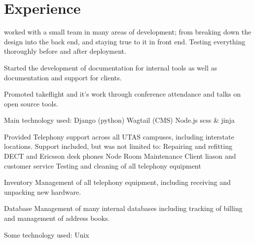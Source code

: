 \documentclass[a4paper]{deedy-resume} %
\begin{document}
\begin{minipage}[t]{0.66\textwidth} %


\section{Experience}


\vspace{\topsep} %
\begin{tightitemize}
\item worked with a small team in many areas of development; from breaking down the design into the back end, and staying true to it in front end. Testing everything thoroughly before and after deployment. \\
\item Started the development of documentation for internal tools as well as documentation and support for clients. \\
\item Promoted takeflight and it's work through conference attendance and talks on open source tools. \\
\item Main technology used: Django (python) \textbullet{} Wagtail (CMS) \textbullet{} Node.js \textbullet{} scss & jinja \\
\end{tightitemize}

\sectionspace %



\begin{tightitemize}
\item Provided Telephony support across all UTAS campuses, including interstate locations. Support included, but was not limited to: Repairing and refitting DECT and Ericsson desk phones \textbullet{} Node Room Maintenance \textbullet{} Client liason and customer service \textbullet{} Testing and cleaning of all telephony equipment \\
\item Inventory Management of all telephony equipment, including receiving and unpacking new hardware. \\
\item Database Management of many internal databases including tracking of billing and management of address books.\\
\item Some technology used: Unix \\
\end{tightitemize}


\end{minipage}
\end{document}
